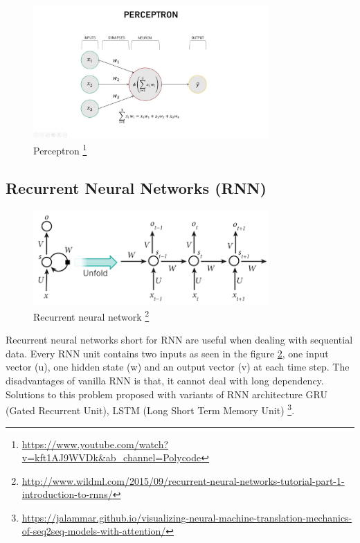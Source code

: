 \begin{figure}[t]
            \includegraphics[width=9cm]{thesis/figures/perceptronLearningAlgo.jpg}
            \centering
            \caption{Perceptron \footnote{\url{https://www.youtube.com/watch?v=kft1AJ9WVDk&ab_channel=Polycode}}}
            \label{fig:PLA}
\end{figure}
\subsection {Recurrent Neural Networks (RNN)}
\begin{figure}[]
            \includegraphics[width=9cm]{thesis/figures/RNN.png}
            \centering
            \caption{Recurrent neural network \footnote{\url{http://www.wildml.com/2015/09/recurrent-neural-networks-tutorial-part-1-introduction-to-rnns/}}}
            \label{fig:RNN}
\end{figure}
Recurrent neural networks short for RNN \cite{mikolov2010recurrent} are useful when dealing with sequential data. Every RNN unit contains two inputs as seen in the figure \ref{fig:RNN}, one input vector (u), one hidden state (w) and an output vector (v) at each time step. The disadvantages of vanilla RNN is that, it  cannot deal with long dependency. Solutions to this problem proposed with variants of RNN architecture GRU (Gated Recurrent Unit), LSTM (Long Short Term Memory Unit) \cite{mikolov2010recurrent}\footnote{\url{https://jalammar.github.io/visualizing-neural-machine-translation-mechanics-of-seq2seq-models-with-attention/}}.
